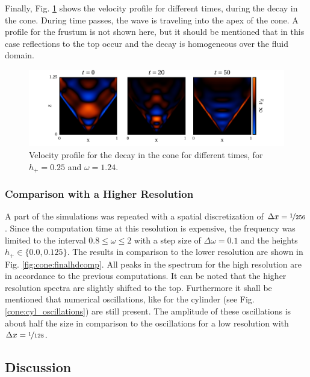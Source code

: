 Finally, Fig. \ref{fig:cone:decayphaseexample} shows the velocity profile for different times, during the decay in
the cone. During time passes, the wave is traveling into the apex of the cone.
A profile for the frustum is not shown here, but it should be mentioned that in this case reflections to the top occur
and the decay is homogeneous over the fluid domain.

\begin{figure}[!b]
  \centering
  \includegraphics{gfx/cone/final/decay/phase_decay.pdf}
  \caption{
      \label{fig:cone:decayphaseexample}
        Velocity profile for the decay in the cone for different times, for $h_+=0.25$ and $\omega=1.24$.
    }
\end{figure}

\subsubsection{Comparison with a Higher Resolution}

A part of the simulations was repeated with a spatial discretization of $\Delta x= \nicefrac{1}{256}$.
Since the computation time at this resolution is expensive, the frequency was limited
to the interval $0.8\leq\omega\leq2$ with a step size of $\Delta \omega = 0.1$ and the heights
$h_+\in\{0.0, 0.125\}$.
The results in comparison to the lower resolution are shown in Fig. \ref{fig:cone:finalhdcomp}.
All peaks in the spectrum for the high resolution are in accordance to the previous computations.
It can be noted that the higher resolution spectra are slightly shifted to the top.
Furthermore it shall be mentioned that numerical oscillations, like for the cylinder
(see Fig. \ref{cone:cyl_oscillations}) are still present.
The amplitude of these oscillations is about half the size in comparison to the oscillations for
a low resolution with $\Delta x = \nicefrac{1}{128}$.

\subsection{Discussion}%


